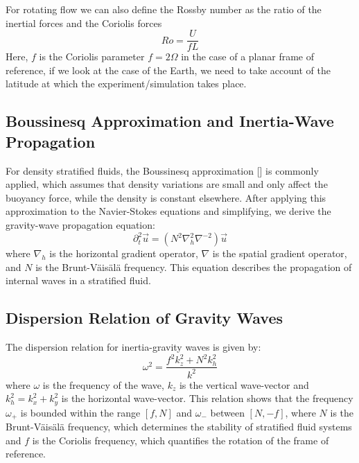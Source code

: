 \documentclass[final,5p,times,twocolumn,authoryear]{elsarticle}
\begin{document}
For rotating flow we can also define the Rossby number as the ratio of the inertial forces and the Coriolis forces
\begin{equation*}
	Ro = \frac{U}{fL}
\end{equation*}
Here, $f$ is the Coriolis parameter $f = 2\Omega$ in the case of a planar frame of reference, if we look at the case of the Earth, we need to take account of the latitude at which the experiment/simulation takes place.

\subsection{Boussinesq Approximation and Inertia-Wave Propagation}

For density stratified fluids, the Boussinesq approximation [\cite{boussinesq_theorie_1897}] is commonly applied, which assumes that density variations are small and only affect the buoyancy force, while the density is constant elsewhere. After applying this approximation to the Navier-Stokes equations and simplifying, we derive the gravity-wave propagation equation:
\begin{equation}
\partial^2_t \vec{u} = \left( N^2 \nabla^2_h \nabla^{-2} \right) \vec{u} \label{eq:Wave Propagation}
\end{equation}
where $\nabla_h$ is the horizontal gradient operator, $\nabla$ is the spatial gradient operator, and $N$ is the Brunt-Väisälä frequency. This equation describes the propagation of internal waves in a stratified fluid.

\subsection{Dispersion Relation of Gravity Waves}

The dispersion relation for inertia-gravity waves is given by:
\begin{equation}
\omega^2 = \frac{f^2 k_z^2 + N^2 k_h^2}{k^2} \label{eq:Dispersion relation}
\end{equation}
where $\omega$ is the frequency of the wave, $k_z$ is the vertical wave-vector and $k_h^2 = k_x^2 + k_y^2$ is the horizontal wave-vector. This relation shows that the frequency $\omega_+$ is bounded within the range $\left[ f, N \right]$ and $\omega_-$ between $\left[ N, -f \right]$, where $N$ is the Brunt-Väisälä frequency, which determines the stability of stratified fluid systems and $f$ is the Coriolis frequency, which quantifies the rotation of the frame of reference.
\end{document}
